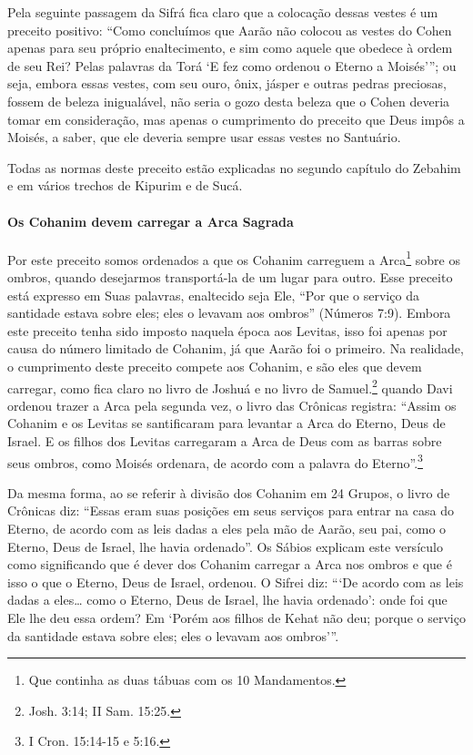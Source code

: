 Pela seguinte passagem da Sifrá fica claro que a colocação dessas vestes
é um preceito positivo: ``Como concluímos que Aarão não colocou as
vestes do Cohen apenas para seu próprio enaltecimento, e sim como
aquele que obedece à ordem de seu Rei? Pelas palavras da Torá `E fez
como ordenou o Eterno a Moisés'''; ou seja, embora essas vestes, com seu
ouro, ônix, jásper e outras pedras preciosas, fossem de beleza
inigualável, não seria o gozo desta beleza que o Cohen deveria tomar
em consideração, mas apenas o cumprimento do preceito que Deus impôs a
Moisés, a saber, que ele deveria sempre usar essas vestes no Santuário.

Todas as normas deste preceito estão explicadas no segundo capítulo do
Zebahim e em vários trechos de Kipurim e de Sucá.

\paragraph{Os Cohanim devem carregar a Arca Sagrada}


Por este preceito somos ordenados a que os Cohanim carreguem
a Arca\footnote{Que continha as duas tábuas com os 10 Mandamentos.} sobre os ombros, quando desejarmos
transportá-la de um lugar para
outro. Esse preceito está expresso em Suas palavras, enaltecido seja
Ele, ``Por que o serviço da santidade estava sobre eles; eles o levavam aos
ombros'' (Números 7:9). Embora este preceito tenha sido imposto naquela
época aos Levitas, isso foi apenas por causa do número limitado de
Cohanim, já que Aarão
foi o primeiro. Na realidade, o cumprimento deste preceito compete aos
Cohanim, e são eles que devem carregar, como fica claro no livro de
Joshuá e no livro de Samuel.\footnote{Josh. 3:14; II Sam. 15:25.} quando Davi ordenou trazer a
Arca pela segunda vez, o livro das Crônicas registra: ``Assim os Cohanim e os Levitas se santificaram
para levantar a Arca do Eterno, Deus de Israel. E os filhos dos Levitas
carregaram a Arca de Deus com as barras sobre seus ombros, como Moisés
ordenara, de acordo com a palavra do Eterno''.\footnote{I Cron. 15:14-15 e 5:16.}


Da mesma forma, ao se referir à divisão dos Cohanim em 24 Grupos, o
livro de Crônicas diz: ``Essas eram suas posições em seus serviços para
entrar na casa do Eterno, de acordo com as leis dadas a eles pela mão de
Aarão, seu pai, como o Eterno, Deus de Israel, lhe havia ordenado''. Os
Sábios explicam este versículo como significando que é dever dos
Cohanim carregar a Arca nos ombros e que é isso o que o Eterno, Deus
de Israel, ordenou. O Sifrei diz: ```De acordo com as leis dadas a eles\ldots{}
como o Eterno, Deus de Israel, lhe havia ordenado': onde foi que
Ele lhe deu essa ordem? Em `Porém aos filhos de Kehat não deu; porque o
serviço da santidade estava sobre eles; eles o levavam aos ombros'''.

